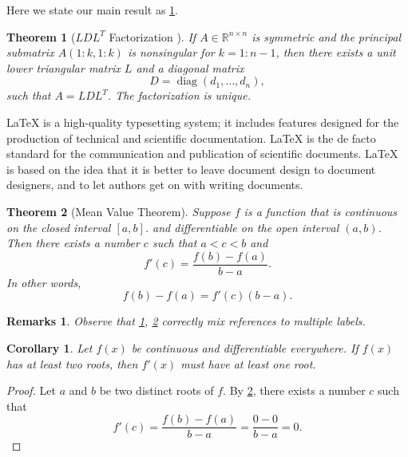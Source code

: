 \documentclass[openany,twoside,12pt]{book}
\theoremstyle{plain}
\newtheorem{theorem}{Theorem}[chapter]
\newtheorem{corollary}{Corollary}[chapter]
\newtheorem{remark}{Remarks}[chapter]
\numberwithin{equation}{chapter}
\numberwithin{figure}{chapter}
\numberwithin{table}{chapter}
\begin{document}
Here we state our main result as \ref{thm:bigthm}.

\begin{theorem}[$LDL^T$ Factorization \cite{Adams2003}]\label{thm:bigthm}
  If $A \in \mathbb{R}^{n \times n}$ is symmetric and the principal
  submatrix $A(1:k,1:k)$ is nonsingular for $k=1:n-1$, then there
  exists a unit lower triangular matrix $L$ and a diagonal matrix
  \begin{equation*}
    D = \operatorname{diag}(d_1,\dots,d_n),  %
  \end{equation*}
  such that $A=LDL^T$. The factorization is unique.
\end{theorem}

LaTeX is a high-quality typesetting system; it includes features designed
for the production of technical and scientific documentation.
LaTeX is the de facto standard for the communication and publication of scientific documents.
LaTeX is based on the idea that it is better to leave document design to
document designers, and to let authors get on with writing documents.

\begin{theorem}[Mean Value Theorem]\label{thm:mvt}
  Suppose $f$ is a function that is continuous on the closed interval
  $[a,b]$.  and differentiable on the open interval $(a,b)$.
  Then there exists a number $c$ such that $a < c < b$ and
  \begin{equation*}
    f'(c) = \frac{f(b)-f(a)}{b-a}.
  \end{equation*}
  In other words,
  \begin{equation*}
    f(b)-f(a) = f'(c)(b-a).
  \end{equation*}
\end{theorem}

\begin{remark}
Observe that \ref{thm:bigthm}, \ref{thm:mvt} correctly mix references
to multiple labels.
\end{remark}


\begin{corollary}\label{cor:a}
  Let $f(x)$ be continuous and differentiable everywhere. If $f(x)$
  has at least two roots, then $f'(x)$ must have at least one root.
\end{corollary}
\begin{proof}
  Let $a$ and $b$ be two distinct roots of $f$.
  By \ref{thm:mvt}, there exists a number $c$ such that
  \begin{equation*}
    f'(c) = \frac{f(b)-f(a)}{b-a} = \frac{0-0}{b-a} = 0.
  \end{equation*}
\end{proof}
\end{document}
